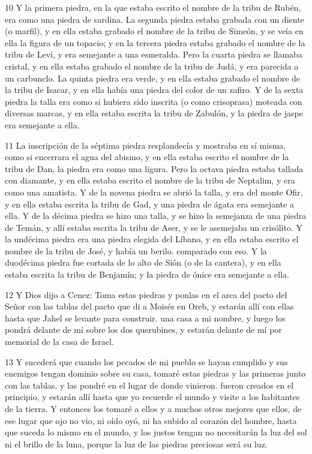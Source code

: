 \par 10 Y la primera piedra, en la que estaba escrito el nombre de la tribu de Rubén, era como una piedra de sardina. La segunda piedra estaba grabada con un diente (o marfil), y en ella estaba grabado el nombre de la tribu de Simeón, y se veía en ella la figura de un topacio; y en la tercera piedra estaba grabado el nombre de la tribu de Leví, y era semejante a una esmeralda. Pero la cuarta piedra se llamaba cristal, y en ella estaba grabado el nombre de la tribu de Judá, y era parecida a un carbunclo. La quinta piedra era verde, y en ella estaba grabado el nombre de la tribu de Isacar, y en ella había una piedra del color de un zafiro. Y de la sexta piedra la talla era como si hubiera sido inscrita (o como crisoprasa) moteada con diversas marcas, y en ella estaba escrita la tribu de Zabulón, y la piedra de jaspe era semejante a ella.

\par 11 La inscripción de la séptima piedra resplandecía y mostraba en sí misma, como si encerrara el agua del abismo, y en ella estaba escrito el nombre de la tribu de Dan, la piedra era como una ligura. Pero la octava piedra estaba tallada con diamante, y en ella estaba escrito el nombre de la tribu de Neptalim, y era como una amatista. Y de la novena piedra se abrió la talla, y era del monte Ofir, y en ella estaba escrita la tribu de Gad, y una piedra de ágata era semejante a ella. Y de la décima piedra se hizo una talla, y se hizo la semejanza de una piedra de Temán, y allí estaba escrita la tribu de Aser, y se le asemejaba un crisólito. Y la undécima piedra era una piedra elegida del Líbano, y en ella estaba escrito el nombre de la tribu de José, y había un berilo. comparado con eso. Y la duodécima piedra fue cortada de lo alto de Sión (o de la cantera), y en ella estaba escrita la tribu de Benjamín; y la piedra de ónice era semejante a ella.

\par 12 Y Dios dijo a Cenez: Toma estas piedras y ponlas en el arca del pacto del Señor con las tablas del pacto que di a Moisés en Oreb, y estarán allí con ellas hasta que Jahel se levante para construir. una casa a mi nombre, y luego los pondrá delante de mí sobre los dos querubines, y estarán delante de mí por memorial de la casa de Israel.

\par 13 Y sucederá que cuando los pecados de mi pueblo se hayan cumplido y sus enemigos tengan dominio sobre su casa, tomaré estas piedras y las primeras junto con las tablas, y las pondré en el lugar de donde vinieron. fueron creados en el principio, y estarán allí hasta que yo recuerde el mundo y visite a los habitantes de la tierra. Y entonces los tomaré a ellos y a muchos otros mejores que ellos, de ese lugar que ojo no vio, ni oído oyó, ni ha subido al corazón del hombre, hasta que suceda lo mismo en el mundo, y los justos tengan no necesitarán la luz del sol ni el brillo de la luna, porque la luz de las piedras preciosas será su luz.

